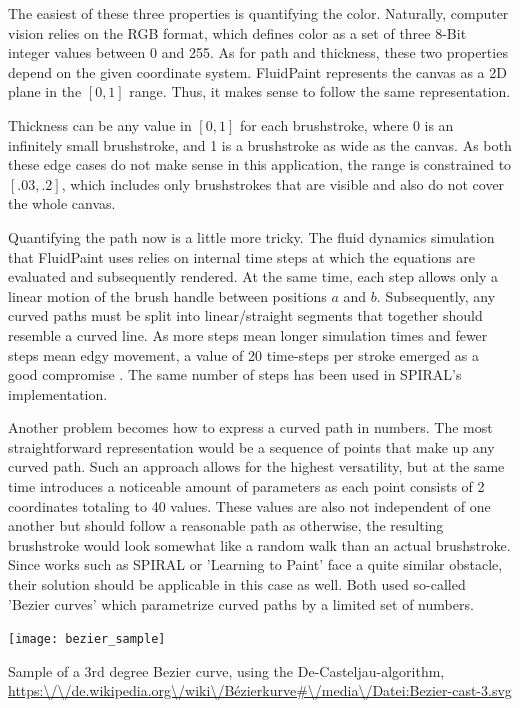 The easiest of these three properties is quantifying the color.
Naturally, computer vision relies on the RGB format, which defines color as a set of three 8-Bit integer values between 0 and 255. 
As for path and thickness, these two properties depend on the given coordinate system.
FluidPaint represents the canvas as a 2D plane in the $[0, 1]$ range.
Thus, it makes sense to follow the same representation.

Thickness can be any value in $[0, 1]$  for each brushstroke, where 0 is an infinitely small brushstroke, and 1 is a brushstroke as wide as the canvas.
As both these edge cases do not make sense in this application, the range is constrained to $[.03, .2]$, which includes only brushstrokes that are visible and also do not cover the whole canvas.

Quantifying the path now is a little more tricky.
The fluid dynamics simulation that FluidPaint uses relies on internal time steps at which the equations are evaluated and subsequently rendered.
At the same time, each step allows only a linear motion of the brush handle between positions $a$ and $b$.
Subsequently, any curved paths must be split into linear/straight segments that together should resemble a curved line.
As more steps mean longer simulation times and fewer steps mean edgy movement, a value of 20 time-steps per stroke emerged as a good compromise .
The same number of steps has been used in SPIRAL's implementation.

Another problem becomes how to express a curved path in numbers.
The most straightforward representation would be a sequence of points that make up any curved path.
Such an approach allows for the highest versatility, but at the same time introduces a noticeable amount of parameters as each point consists of 2 coordinates totaling to 40 values.
These values are also not independent of one another but should follow a reasonable path as otherwise, the resulting brushstroke would look somewhat like a random walk than an actual brushstroke.
Since works such as SPIRAL or 'Learning to Paint' face a quite similar obstacle, their solution should be applicable in this case as well.
Both used so-called 'Bezier curves' which parametrize curved paths by a limited set of numbers.
\begin{marginfigure}
    \texttt{[image: bezier\_sample]}
    \caption[]{Sample of a 3rd degree Bezier curve, using the De-Casteljau-algorithm,
    \url{https:\/\/de.wikipedia.org\/wiki\/Bézierkurve\#\/media\/Datei:Bezier-cast-3.svg}}
\end{marginfigure}

